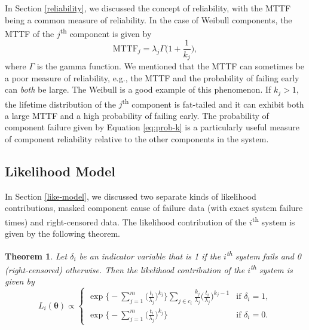 \documentclass[
]{article}
\theoremstyle{definition}
\theoremstyle{plain}
\newtheorem{theorem}{Theorem}[section]
\theoremstyle{definition}
\theoremstyle{definition}
\theoremstyle{definition}
\theoremstyle{definition}
\theoremstyle{remark}
\begin{document}
In Section \ref{reliability}, we discussed the concept of reliability, with
the MTTF being a common measure of reliability. In the case of Weibull
components, the MTTF of the \(j\)\textsuperscript{th} component is given by
\begin{equation}
\label{eq:mttf-weibull}
\text{MTTF}_j = \lambda_j \Gamma\biggl(1 + \frac{1}{k_j}\biggr),
\end{equation}
where \(\Gamma\) is the gamma function. We mentioned that the MTTF can sometimes
be a poor measure of reliability, e.g., the MTTF and the probability of failing
early can \emph{both} be large. The Weibull is a good example of this phenomenon.
If \(k_j > 1\), the lifetime distribution of the \(j\)\textsuperscript{th} component
is fat-tailed and it can exhibit both a large MTTF and a high probability of
failing early. The probability of component failure given by Equation
\eqref{eq:prob-k} is a particularly useful measure of component reliability
relative to the other components in the system.

\hypertarget{sys-weibull-like}{%
\subsection{Likelihood Model}\label{sys-weibull-like}}

In Section \ref{like-model}, we discussed two separate kinds of likelihood
contributions, masked component cause of failure data (with exact system failure
times) and right-censored data. The likelihood contribution of the
\(i\)\textsuperscript{th} system is given by the following theorem.

\begin{theorem}
\protect\hypertarget{thm:weibull-likelihood-contribution}{}\label{thm:weibull-likelihood-contribution}Let \(\delta_i\) be an indicator variable that is 1 if the
\(i\)\textsuperscript{th} system fails and 0 (right-censored) otherwise.
Then the likelihood contribution of the \(i\)\textsuperscript{th} system is given by
\begin{equation}
\label{eq:weibull-likelihood-contribution}
L_i(\boldsymbol{\theta}) \propto
\begin{cases}
    \exp\biggl\{-\sum_{j=1}^{m}\bigl(\frac{t_i}{\lambda_j}\bigr)^{k_j}\biggr\}
        \sum_{j \in c_i} \frac{k_j}{\lambda_j}\bigl(\frac{t_i}{\lambda_j}\bigr)^{k_j-1}
    & \text{if } \delta_i = 1,\\
    \exp\bigl\{-\sum_{j=1}^{m}\bigl(\frac{t_i}{\lambda_j}\bigr)^{k_j}\biggr\} & \text{if } \delta_i = 0.
\end{cases}
\end{equation}
\end{theorem}
\end{document}
